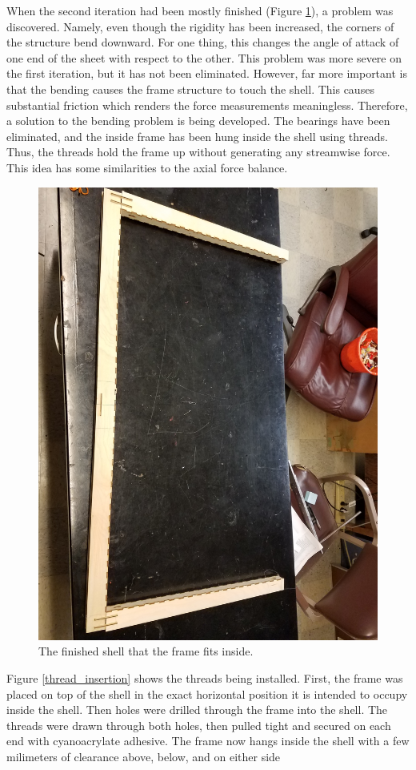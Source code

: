 \documentclass[12pt]{report} %
\begin{document}
When the second iteration had been mostly finished (Figure \ref{shell_finished}), a problem was discovered. Namely, even
though the rigidity has been increased, the corners of the structure bend downward. For one thing, this changes the angle of attack
of one end of the sheet with respect to the other. This problem was more severe on the first iteration, but it has not been eliminated.
However, far more important is that the bending causes the frame structure to touch the shell. This causes substantial friction which
renders the force measurements meaningless. Therefore, a solution to the bending problem is being developed. The bearings have been
eliminated, and the inside frame has been hung inside the shell using threads. Thus, the threads hold the frame up without generating
any streamwise force. This idea has some similarities to the axial force balance.

\begin{figure}
\includegraphics[width = 0.7\linewidth]{shell_finished.jpg}
\centering
\caption{The finished shell that the frame fits inside.}
\label{shell_finished}
\end{figure}

Figure \ref{thread_insertion} shows the threads being installed. First, the frame was placed on top of the shell in the exact
horizontal position it is intended to occupy inside the shell. Then holes were drilled through the frame into the shell. The
threads were drawn through both holes, then pulled tight and secured on each end with cyanoacrylate adhesive. The frame now
hangs inside the shell with a few milimeters of clearance above, below, and on either side
\end{document}

